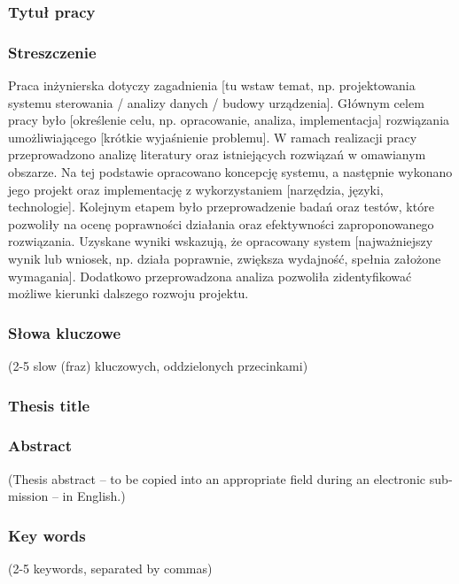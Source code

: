 \subsubsection*{Tytuł pracy} 
\Title

\subsubsection*{Streszczenie}  
Praca inżynierska dotyczy zagadnienia [tu wstaw temat, np. projektowania systemu sterowania / analizy danych / budowy urządzenia]. Głównym celem pracy było [określenie celu, np. opracowanie, analiza, implementacja] rozwiązania umożliwiającego [krótkie wyjaśnienie problemu].
W ramach realizacji pracy przeprowadzono analizę literatury oraz istniejących rozwiązań w omawianym obszarze. Na tej podstawie opracowano koncepcję systemu, a następnie wykonano jego projekt oraz implementację z wykorzystaniem [narzędzia, języki, technologie]. Kolejnym etapem było przeprowadzenie badań oraz testów, które pozwoliły na ocenę poprawności działania oraz efektywności zaproponowanego rozwiązania.
Uzyskane wyniki wskazują, że opracowany system [najważniejszy wynik lub wniosek, np. działa poprawnie, zwiększa wydajność, spełnia założone wymagania]. Dodatkowo przeprowadzona analiza pozwoliła zidentyfikować możliwe kierunki dalszego rozwoju projektu.

\subsubsection*{Słowa kluczowe} 
(2-5 slow (fraz) kluczowych, oddzielonych przecinkami)

\subsubsection*{Thesis title} 
\begin{otherlanguage}{british}
\TitleAlt
\end{otherlanguage}

\subsubsection*{Abstract} 
\begin{otherlanguage}{british}
(Thesis abstract – to be copied into an appropriate field during an electronic submission – in English.)
\end{otherlanguage}
\subsubsection*{Key words}  
\begin{otherlanguage}{british}
(2-5 keywords, separated by commas)
\end{otherlanguage}

